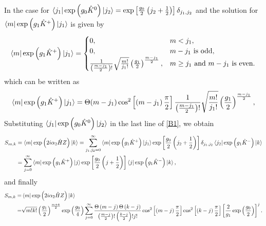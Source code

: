 \documentclass[12pt]{article}
\numberwithin{equation}{section}
\begin{document}
In the case for $\bra{j_1} \exp\left(g_0 \hat{K}^{0} \right)\ket{j_2}=\exp\left[\frac{g_0}{2} \left(j_2+\frac{1}{2}\right)\right] \delta_{j_1,j_2}$ and the solution for $\bra{m} \exp\left( g_1 \hat{K}^+ \right) \ket{j_1}$ is given by
\begin{align} \label{B6}
\bra{m} \exp\left( g_1 \hat{K}^+ \right) \ket{j_1}=
\begin{cases}
0, & m<j_1,\\
0, &  m-j_1 \text{ is odd,}\\
\frac{1}{\left(\frac{m-j_1}{2} \right)! } \sqrt{\frac{m!}{j_1!}}\left(\frac{g_1}{2} \right)^{\frac{m-j_1}{2}} ,  &  m\geq j_1 \text{ and }  m-j_1 \text{ is even.}
\end{cases}
\end{align}
which can be written as
\begin{align} \label{B7}
\bra{m} \exp\left( g_1 \hat{K}^+ \right) \ket{j_1}=
\Theta(m-j_1)\cos^2\left[\left(m-j_1 \right)\frac{\pi}{2}  \right]\frac{1}{\left(\frac{m-j_1}{2} \right)! } \sqrt{\frac{m!}{j_1!}}\left(\frac{g_1}{2} \right)^{\frac{m-j_1}{2}},
\end{align}
Substituting $\bra{j_1} \exp\left(g_0 \hat{K}^{0} \right)\ket{j_2}$ in the last line of \eqref{B1}, we obtain
\begin{align} \label{B8}
S_{m,k}&=\bra{m} \exp\left( 2 i \alpha_{2}\hat{H} Z \right) \ket{k}
=\sum_{j_1,j_2=0}^{\infty} \bra{m} \exp\left( g_1 \hat{K}^+ \right) \ket{j_1}
\exp\left[\frac{g_0}{2} \left(j_2+\frac{1}{2}\right)\right] \delta_{j_1,j_2}
\bra{j_2} \exp\left(g_1 \hat{K}^- \right)  \ket{k}
\nonumber \\  &
=\sum_{j=0}^{\infty} \bra{m} \exp\left( g_1 \hat{K}^+ \right) \ket{j}
\exp\left[\frac{g_0}{2} \left(j+\frac{1}{2}\right)\right] 
\bra{j} \exp\left(g_1 \hat{K}^- \right)  \ket{k},
\end{align}
and finally
\begin{align}  \label{B9}
S_{m,k}=&\bra{m} \exp\left( 2 i \alpha_{2}\hat{H} Z \right) \ket{k}
\nonumber \\
=&\sqrt{m!k!}\left(\frac{g_1}{2} \right) ^{\frac{m+k}{2}} \exp\left(\frac{g_0}{4} \right) 
\sum_{j=0}^{\infty} \frac{\Theta\left(m-j \right) \Theta\left(k-j \right) }{\left(\frac{m-j}{2} \right) ! \left(\frac{k-j}{2} \right) ! j!}  
\cos^2\left[\left(m-j \right)\frac{\pi}{2}  \right] \cos^2\left[\left(k-j \right)\frac{\pi}{2}  \right] 
\nonumber \left[ \frac{2}{g_1} \exp\left(\frac{g_0}{2} \right) \right]^j.
\end{align}
\end{document}
